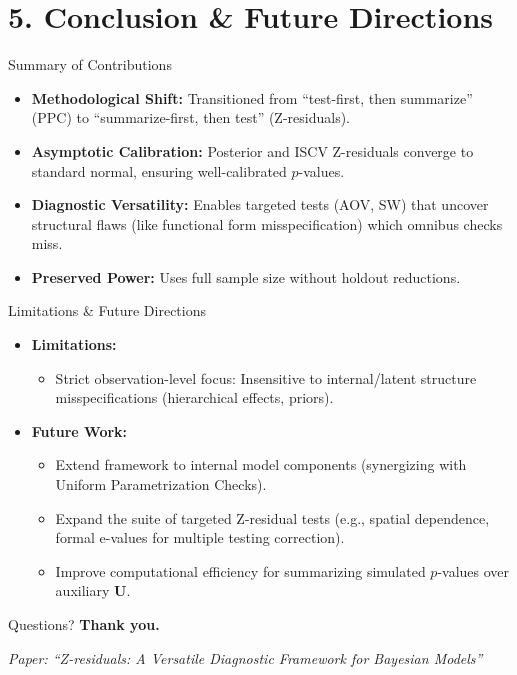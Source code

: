 \documentclass[
  ignorenonframetext,
]{beamer}
\providecommand{\tightlist}{%
  \setlength{\itemsep}{0pt}\setlength{\parskip}{0pt}}
\begin{document}
\section{5. Conclusion \& Future
Directions}\label{conclusion-future-directions}

\begin{frame}{Summary of Contributions}
\protect{}\label{summary-of-contributions}
\begin{itemize}
\tightlist
\item
  \textbf{Methodological Shift:} Transitioned from ``test-first, then
  summarize'' (PPC) to ``summarize-first, then test'' (Z-residuals).
\item
  \textbf{Asymptotic Calibration:} Posterior and ISCV Z-residuals
  converge to standard normal, ensuring well-calibrated \(p\)-values.
\item
  \textbf{Diagnostic Versatility:} Enables targeted tests (AOV, SW) that
  uncover structural flaws (like functional form misspecification) which
  omnibus checks miss.
\item
  \textbf{Preserved Power:} Uses full sample size without holdout
  reductions.
\end{itemize}
\end{frame}

\begin{frame}{Limitations \& Future Directions}
\protect{}\label{limitations-future-directions}
\begin{itemize}
\tightlist
\item
  \textbf{Limitations:}

  \begin{itemize}
  \tightlist
  \item
    Strict observation-level focus: Insensitive to internal/latent
    structure misspecifications (hierarchical effects, priors).
  \end{itemize}
\item
  \textbf{Future Work:}

  \begin{itemize}
  \tightlist
  \item
    Extend framework to internal model components (synergizing with
    Uniform Parametrization Checks).
  \item
    Expand the suite of targeted Z-residual tests (e.g., spatial
    dependence, formal e-values for multiple testing correction).
  \item
    Improve computational efficiency for summarizing simulated
    \(p\)-values over auxiliary \(\mathbf{U}\).
  \end{itemize}
\end{itemize}
\end{frame}

\begin{frame}{Questions?}
\protect{}\label{questions}
\textbf{Thank you.}

\emph{Paper: ``Z-residuals: A Versatile Diagnostic Framework for
Bayesian Models''}
\end{frame}
\end{document}
